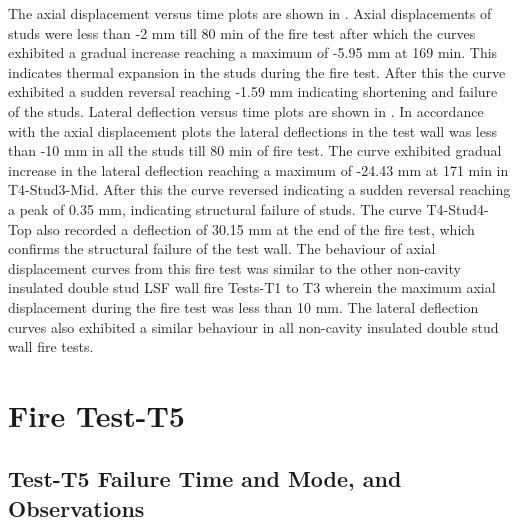 The axial displacement versus time plots are shown in . Axial displacements of studs were less than -2 mm till 80 min of the fire test after which the curves exhibited a gradual increase reaching a maximum of -5.95 mm at 169 min. This indicates thermal expansion in the studs during the fire test. After this the curve exhibited a sudden reversal reaching -1.59 mm indicating shortening and failure of the studs. Lateral deflection versus time plots are shown in . In accordance with the axial displacement plots the lateral deflections in the test wall was less than -10 mm in all the studs till 80 min of fire test. The curve exhibited gradual increase in the lateral deflection reaching a maximum of -24.43 mm at 171 min in T4-Stud3-Mid. After this the curve reversed indicating a sudden reversal reaching a peak of 0.35 mm, indicating structural failure of studs. The curve T4-Stud4-Top also recorded a deflection of 30.15 mm at the end of the fire test, which confirms the structural failure of the test wall. The behaviour of axial displacement curves from this fire test was similar to the other non-cavity insulated double stud LSF wall fire Tests-T1 to T3 wherein the maximum axial displacement during the fire test was less than 10 mm. The lateral deflection curves also exhibited a similar behaviour in all non-cavity insulated double stud wall fire tests.

\section{Fire Test-T5}
\subsection{Test-T5 Failure Time and Mode, and Observations}

